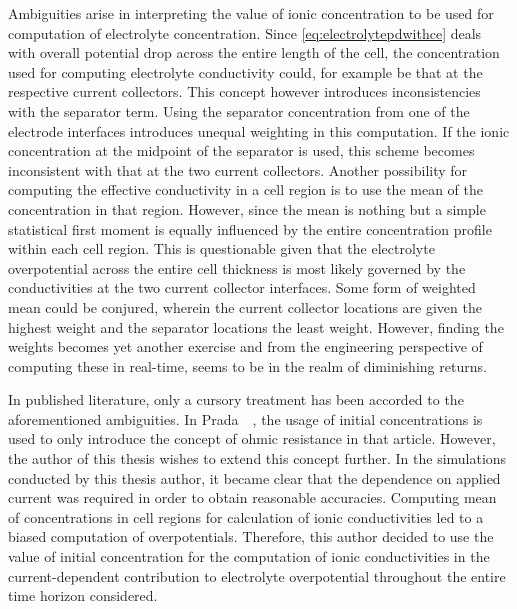 Ambiguities   arise   in  interpreting   the   value   of  ionic   concentration
to   be    used   for   computation   of    electrolyte   concentration.   Since
\cref{eq:electrolytepdwithce}  deals  with  overall potential  drop  across  the
entire  length of  the cell,  the concentration  used for  computing electrolyte
conductivity could,  for example be  that at the respective  current collectors.
This concept however  introduces inconsistencies with the  separator term. Using
the  separator concentration  from one  of the  electrode interfaces  introduces
unequal  weighting  in this  computation.  If  the  ionic concentration  at  the
midpoint of the separator is used, this scheme becomes inconsistent with that at
the  two current  collectors. Another  possibility for  computing the  effective
conductivity in a  cell region is to  use the mean of the  concentration in that
region. However, since the mean is nothing but a simple statistical first moment
is  equally influenced  by the  entire  concentration profile  within each  cell
region. This is questionable given that the electrolyte overpotential across the
entire cell thickness  is most likely governed by the  conductivities at the two
current  collector interfaces.  Some form  of weighted  mean could  be conjured,
wherein the  current collector locations  are given  the highest weight  and the
separator locations the  least weight. However, finding the  weights becomes yet
another  exercise and  from the  engineering perspective  of computing  these in
real-time, seems to be in the realm of diminishing returns.

In  published  literature,  only  a  cursory  treatment  has  been  accorded  to
the  aforementioned  ambiguities.  In  Prada~\etal~\cite{Prada2012},  the  usage
of  initial concentrations  is  used  to only  introduce  the  concept of  ohmic
resistance  in that  article.  However,  the author  of  this  thesis wishes  to
extend  this  concept further.  In  the  simulations  conducted by  this  thesis
author, it  became clear  that the  dependence on  applied current  was required
in  order to  obtain  reasonable accuracies.  Computing  mean of  concentrations
in  cell  regions for  calculation  of  ionic  conductivities  led to  a  biased
computation of overpotentials.  Therefore, this author decided to  use the value
of  initial concentration  for the  computation of  ionic conductivities  in the
current-dependent  contribution  to  electrolyte  overpotential  throughout  the
entire time horizon considered.

